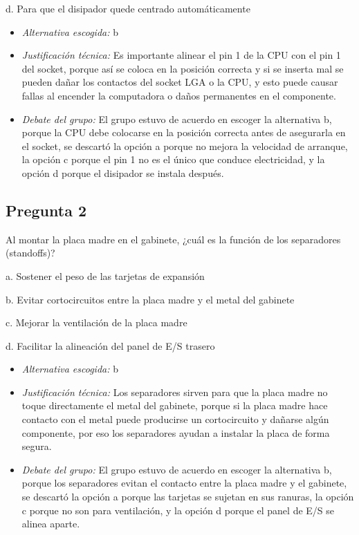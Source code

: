 \documentclass{article}
\begin{document}
d. Para que el disipador quede centrado automáticamente

\begin{itemize}
\item \emph{Alternativa escogida:} b
\item \emph{Justificación técnica:} Es importante alinear el pin 1 de la CPU
con el pin 1 del socket, porque así se coloca en la posición
correcta y si se inserta mal se pueden dañar los contactos del
socket LGA o la CPU, y esto puede causar fallas al encender la
computadora o daños permanentes en el componente.
\item \emph{Debate del grupo:} El grupo estuvo de acuerdo en escoger la alternativa b,
porque la CPU debe colocarse en la posición correcta antes de asegurarla en
el socket, se descartó la opción a porque no mejora la velocidad de arranque,
la opción c porque el pin 1 no es el único que conduce electricidad,
y la opción d porque el disipador se instala después.
\end{itemize}
\subsection{Pregunta 2}
\label{sec:org3588e17}
Al montar la placa madre en el gabinete, ¿cuál es la función de los separadores (standoffs)?

a. Sostener el peso de las tarjetas de expansión

b. Evitar cortocircuitos entre la placa madre y el metal del gabinete

c. Mejorar la ventilación de la placa madre

d. Facilitar la alineación del panel de E/S trasero

\begin{itemize}
\item \emph{Alternativa escogida:} b
\item \emph{Justificación técnica:} Los separadores sirven para que la placa
madre no toque directamente el metal del gabinete, porque si la placa madre
hace contacto con el metal puede producirse un cortocircuito y
dañarse algún componente, por eso los separadores ayudan a instalar
la placa de forma segura.
\item \emph{Debate del grupo:} El grupo estuvo de acuerdo en escoger la
alternativa b, porque los separadores evitan el contacto entre la
placa madre y el gabinete, se descartó la opción a porque las
tarjetas se sujetan en sus ranuras, la opción c porque no son para
ventilación, y la opción d porque el panel de E/S se alinea aparte.
\end{itemize}
\end{document}
